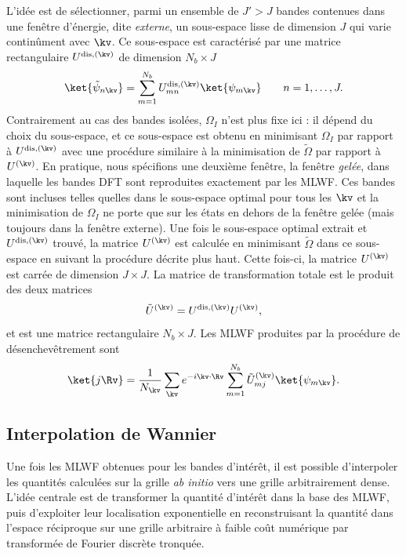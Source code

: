 L'idée est de sélectionner, parmi un ensemble de $J'>J$ bandes contenues dans une fenêtre d'énergie, dite \textit{externe}, un sous-espace lisse de dimension $J$ qui varie continûment avec $\kv$. Ce sous-espace est caractérisé par une matrice rectangulaire $U^{\text{dis},(\kv)}$ de dimension $N_b\times J$
\begin{equation}
    \ket{\tilde{\psi}_{n\kv}}=\sum_{m=1}^{N_b}U_{mn}^{\text{dis},(\kv)}\ket{\psi_{m\kv}}\qquad n=1,\dots,J.
\end{equation}
Contrairement au cas des bandes isolées, $\Omega_I$ n'est plus fixe ici : il dépend du choix du sous-espace, et ce sous-espace est obtenu en minimisant $\Omega_I$ par rapport à $U^{\text{dis},(\kv)}$ avec une procédure similaire à la minimisation de $\widetilde{\Omega}$ par rapport à $U^{(\kv)}$. En pratique, nous spécifions une deuxième fenêtre, la fenêtre \textit{gelée}, dans laquelle les bandes DFT sont reproduites exactement par les MLWF. Ces bandes sont incluses telles quelles dans le sous-espace optimal pour tous les $\kv$ et la minimisation de $\Omega_I$ ne porte que sur les états en dehors de la fenêtre gelée (mais toujours dans la fenêtre externe). Une fois le sous-espace optimal extrait et $U^{\text{dis},(\kv)}$ trouvé, la matrice $U^{(\kv)}$ est calculée en minimisant $\widetilde{\Omega}$ dans ce sous-espace en suivant la procédure décrite plus haut. Cette fois-ci, la matrice $U^{(\kv)}$ est carrée de dimension $J\times J$. La matrice de transformation totale est le produit des deux matrices
\begin{equation}
    \tilde{U}^{(\kv)} = U^{\text{dis},(\kv)}U^{(\kv)},
\end{equation}
et est une matrice rectangulaire $N_b\times J$. Les MLWF produites par la procédure de désenchevêtrement sont
\begin{equation}
    \ket{j\Rv}=\frac{1}{N_\kv}\sum_{\kv}e^{-i\kv\cdot\Rv}\sum_{m=1}^{N_b}\tilde{U}^{(\kv)}_{mj}\ket{\psi_{m\kv}}.\label{eqn:c2_mlwf}
\end{equation}

\subsection{Interpolation de Wannier}

Une fois les MLWF obtenues pour les bandes d'intérêt, il est possible d'interpoler les quantités calculées sur la grille \textit{ab initio} vers une grille arbitrairement dense. L'idée centrale est de transformer la quantité d'intérêt dans la base des MLWF, puis d'exploiter leur localisation exponentielle en reconstruisant la quantité dans l'espace réciproque sur une grille arbitraire à faible coût numérique par transformée de Fourier discrète tronquée.

